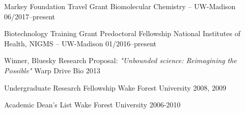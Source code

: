 



\begin{cvhonors}

\cvhonor
    {Markey Foundation Travel Grant} %
    {Biomolecular Chemistry -- UW-Madison} %
    {06/2017--present} %
    
  \cvhonor
    {Biotechnology Training Grant Predoctoral Fellowship} %
    {National Institutes of Health, NIGMS -- UW-Madison} %
    {01/2016--present} %
    
  \cvhonor
    {Winner, Bluesky Research Proposal: \textit{"Unbounded science: Reimagining the Possible"}} %
    {Warp Drive Bio} %
    {2013} %

  \cvhonor
    {Undergraduate Research Fellowship} %
    {Wake Forest University} %
    {2008, 2009} %
   

  \cvhonor
    {Academic Dean's List} %
    {Wake Forest University} %
    {2006-2010} %
   
\end{cvhonors}